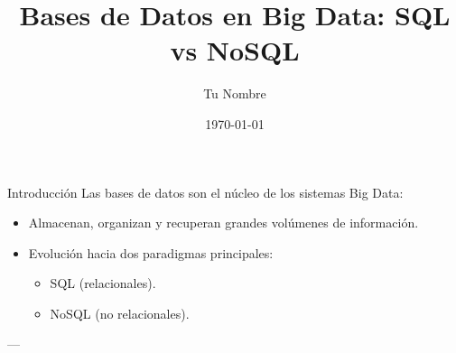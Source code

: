\documentclass[presentation]{beamer}
\author{Tu Nombre}
\date{\today{}}
\title{Bases de Datos en Big Data: SQL vs NoSQL}
\begin{document}
\maketitle

\begin{frame}[label={sec:org0f02cd2}]{Introducción}
Las bases de datos son el núcleo de los sistemas Big Data:
\begin{itemize}
\item Almacenan, organizan y recuperan grandes volúmenes de información.
\item Evolución hacia dos paradigmas principales:
\begin{itemize}
\item \alert{\alert{SQL (relacionales)}}.
\item \alert{\alert{NoSQL (no relacionales)}}.
\end{itemize}
\end{itemize}

---
\end{frame}
\end{document}
